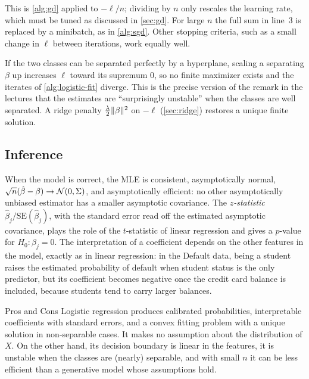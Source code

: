 This is \cref{alg:gd} applied to $-\ell/n$; dividing by $n$ only rescales the learning rate, which must be tuned as discussed in \cref{sec:gd}. For large $n$ the full sum in line~3 is replaced by a minibatch, as in \cref{alg:sgd}. Other stopping criteria, such as a small change in $\ell$ between iterations, work equally well.

\begin{remark}\label{rem:logistic-separable}
If the two classes can be separated perfectly by a hyperplane, scaling a separating $\beta$ up increases $\ell$ toward its supremum $0$, so no finite maximizer exists and the iterates of \cref{alg:logistic-fit} diverge. This is the precise version of the remark in the lectures that the estimates are ``surprisingly unstable'' when the classes are well separated. A ridge penalty $\frac\lambda2\lVert \beta\rVert^2$ on $-\ell$ (\cref{sec:ridge}) restores a unique finite solution.
\end{remark}

\subsection{Inference}

When the model is correct, the MLE is consistent, asymptotically normal, $\sqrt n(\hat\beta-\beta)\to\mathcal{N}(0,\Sigma)$, and asymptotically efficient: no other asymptotically unbiased estimator has a smaller asymptotic covariance. The \emph{$z$-statistic} $\hat\beta_j/\mathrm{SE}(\hat\beta_j)$, with the standard error read off the estimated asymptotic covariance, plays the role of the $t$-statistic of linear regression and gives a $p$-value for $H_0\colon\beta_j=0$. The interpretation of a coefficient depends on the other features in the model, exactly as in linear regression: in the Default data, being a student raises the estimated probability of default when student status is the only predictor, but its coefficient becomes negative once the credit card balance is included, because students tend to carry larger balances.

\begin{notebox}{Pros and Cons}
Logistic regression produces calibrated probabilities, interpretable coefficients with standard errors, and a convex fitting problem with a unique solution in non-separable cases. It makes no assumption about the distribution of $X$. On the other hand, its decision boundary is linear in the features, it is unstable when the classes are (nearly) separable, and with small $n$ it can be less efficient than a generative model whose assumptions hold.
\end{notebox}

